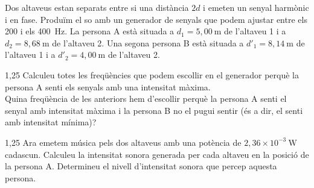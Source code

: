 Dos altaveus estan separats entre si una distància $2d$ i emeten un senyal harmònic i en fase. Produïm el so amb un generador de senyals que podem ajustar entre els 200 i els 400~Hz. La persona A està situada a $d_1 = 5,00\ \mathrm{m}$ de l'altaveu 1 i a $d_2 = 8,68\ \mathrm{m}$ de l'altaveu 2. Una segona persona B està situada a $d'_1 = 8,14\ \mathrm{m}$ de l'altaveu 1 i a $d'_2 = 4,00\ \mathrm{m}$ de l'altaveu 2.


\begin{apartat}{1,25}
Calculeu totes les freqüències que podem escollir en el generador perquè la persona A senti els senyals amb una intensitat màxima.\\
\hspace*{1.5em}Quina freqüència de les anteriors hem d'escollir perquè la persona A senti el senyal amb intensitat màxima i la persona B no el pugui sentir (és a dir, el senti amb intensitat mínima)?
\end{apartat}

\begin{apartat}{1,25}
Ara emetem música pels dos altaveus amb una potència de $2,36\times 10^{-3}\ \mathrm{W}$ cadascun. Calculeu la intensitat sonora generada per cada altaveu en la posició de la persona A. Determineu el nivell d'intensitat sonora que percep aquesta persona.
\end{apartat}

